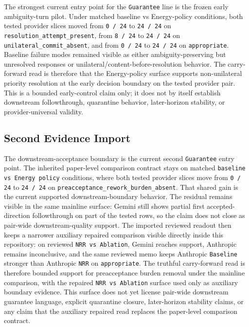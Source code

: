 \documentclass[11pt]{article}
\begin{document}
The strongest current entry point for the \texttt{Guarantee} line is the frozen
early ambiguity-turn pilot. Under matched baseline vs Energy-policy conditions,
both tested provider slices moved from \texttt{0 / 24} to \texttt{24 / 24} on
\texttt{resolution\_attempt\_present}, from \texttt{8 / 24} to
\texttt{24 / 24} on \texttt{unilateral\_commit\_absent}, and from
\texttt{0 / 24} to \texttt{24 / 24} on \texttt{appropriate}. Baseline failure
modes remained visible as either ambiguity-preserving but unresolved responses
or unilateral/content-before-resolution behavior. The carry-forward read is
therefore that the Energy-policy surface supports
non-unilateral priority resolution at the early decision boundary on the tested
provider pair. This is a bounded early-control claim only; it does not by
itself establish downstream followthrough, quarantine behavior,
later-horizon stability, or provider-universal validity.

\subsection{Second Evidence Import}

The downstream-acceptance boundary is the current second \texttt{Guarantee}
entry point. The inherited paper-level comparison contract stays on matched
\texttt{baseline vs Energy policy} conditions, where both tested provider
slices move from \texttt{0 / 24} to \texttt{24 / 24} on
\texttt{preacceptance\_rework\_burden\_absent}. That shared gain is the current
supported downstream-boundary behavior. The residual remains visible in the
same mainline surface: Gemini still shows partial first accepted-direction
followthrough on part of the tested rows, so the claim does not close as
pair-wide downstream-quality support. The imported reviewed readout then keeps a
narrower auxiliary repaired comparison visible directly inside this repository:
on reviewed \texttt{NRR vs Ablation}, Gemini reaches support, Anthropic remains
inconclusive, and the same reviewed memo keeps Anthropic \texttt{Baseline}
stronger than Anthropic \texttt{NRR} on \texttt{appropriate}. The truthful
carry-forward read is therefore bounded support for preacceptance burden
removal under the mainline comparison, with the repaired \texttt{NRR vs
Ablation} surface used only as auxiliary boundary evidence. This surface does
not yet license pair-wide downstream guarantee language, explicit quarantine
closure, later-horizon stability claims, or any claim that the auxiliary
repaired read replaces the paper-level comparison contract.
\end{document}
